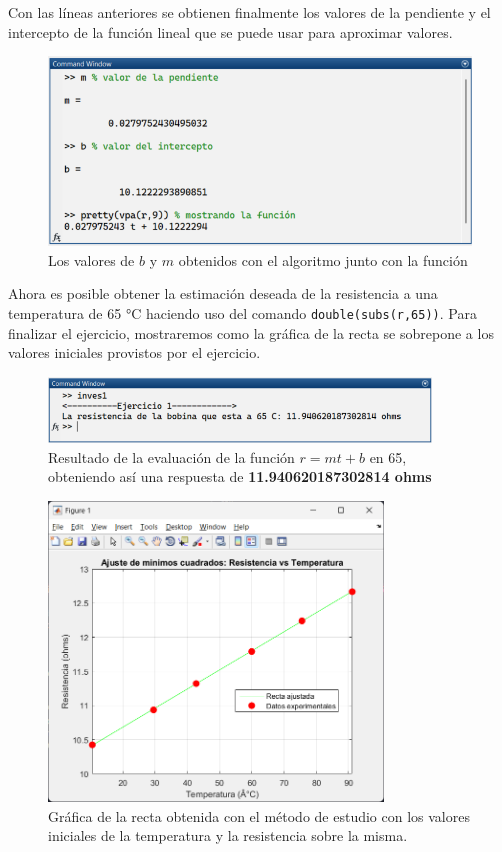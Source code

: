 \documentclass[11pt,letterpaper]{article}
\begin{document}
Con las líneas anteriores se obtienen finalmente los valores de la pendiente y el intercepto de la función lineal que se puede usar para aproximar valores. 
\begin{figure}[H]
\centering
\includegraphics[width=4.5in]{eq1.png}
\caption{Los valores de $b$ y $m$ obtenidos con el algoritmo junto con la función}
\label{figure:lineal1} 
\end{figure}
Ahora es posible obtener la estimación deseada de la resistencia a una temperatura de 65 °C haciendo uso del comando \texttt{double(subs(r,65))}. Para finalizar el ejercicio, mostraremos como la gráfica de la recta se sobrepone a los valores iniciales provistos por el ejercicio. 
\begin{figure}[H]
\centering
\includegraphics[width=4in]{res1.png}
\caption{Resultado de la evaluación de la función $r=mt + b$ en 65, obteniendo así una respuesta de \textbf{11.940620187302814 ohms}}
\label{figure:res1}
\end{figure}
\begin{figure}[H]
\centering
\includegraphics[width=3.5in]{recta.png}
\caption{Gráfica de la recta obtenida con el método de estudio con los valores iniciales de la temperatura y la resistencia sobre la misma. }
\label{figure:recta1}
\end{figure}
\end{document}
